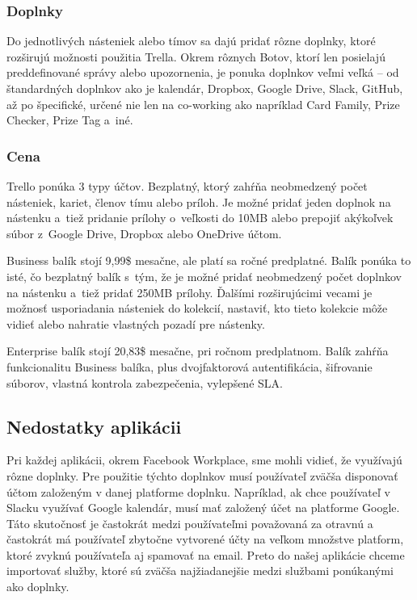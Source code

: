 \subsubsection{Doplnky}
\indent Do jednotlivých násteniek alebo tímov sa dajú pridať rôzne doplnky, ktoré rozširujú možnosti použitia Trella. Okrem rôznych Botov, ktorí len posielajú preddefinované správy alebo upozornenia, je ponuka doplnkov veľmi veľká – od štandardných doplnkov ako je kalendár, Dropbox, Google Drive, Slack, GitHub, až po špecifické, určené nie len na co-working ako napríklad Card Family, Prize Checker, Prize Tag a iné. 
\subsubsection{Cena}
\indent Trello ponúka 3 typy účtov. Bezplatný, ktorý zahŕňa neobmedzený počet násteniek, kariet, členov tímu alebo príloh. Je možné pridať jeden doplnok na nástenku a tiež pridanie prílohy o veľkosti do 10MB alebo prepojiť akýkoľvek súbor z Google Drive, Dropbox alebo OneDrive účtom. 

\indent Business balík stojí 9,99\$ mesačne, ale platí sa ročné predplatné. Balík ponúka to isté, čo bezplatný balík s tým, že je možné pridať neobmedzený počet doplnkov na nástenku a tiež pridať 250MB prílohy. Ďalšími rozširujúcimi vecami je možnosť usporiadania násteniek do kolekcií, nastaviť, kto tieto kolekcie môže vidieť alebo nahratie vlastných pozadí pre nástenky. 

\indent Enterprise balík stojí 20,83\$ mesačne, pri ročnom predplatnom. Balík zahŕňa funkcionalitu Business balíka, plus dvojfaktorová autentifikácia, šifrovanie súborov, vlastná kontrola zabezpečenia, vylepšené SLA. 

\subsection{Nedostatky aplikácii}
\indent Pri každej aplikácii, okrem Facebook Workplace, sme mohli vidieť, že využívajú rôzne doplnky. Pre použitie týchto doplnkov musí používateľ zväčša disponovať účtom založeným v danej platforme doplnku. Napríklad, ak chce používateľ v Slacku využívať Google kalendár, musí mať založený účet na platforme Google. Táto skutočnosť je častokrát medzi používateľmi považovaná za otravnú a častokrát má používateľ zbytočne vytvorené účty na veľkom množstve platform, ktoré zvyknú používateľa aj spamovať na email. Preto do našej aplikácie chceme importovať služby, ktoré sú zväčša najžiadanejšie medzi službami ponúkanými ako doplnky. 


